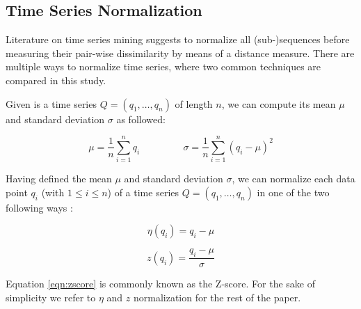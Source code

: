 \subsection{Time Series Normalization} \label{time_series_normalization} 

Literature on time series mining \cite{ding2008querying,spiegel2015diss} suggests to normalize all (sub-)sequences before measuring their pair-wise dissimilarity by means of a distance measure. There are multiple ways to normalize time series, where two common techniques \cite{das1998rule} are compared  in this study.

Given is a time series $Q = (q_1, \dots, q_n)$ of length $n$, we can compute its mean $\mu$ and standard deviation $\sigma$ as followed:

\begin{equation*}
\mu = \frac{1}{n} \sum_{i=1}^{n} q_i 	\;\;\;\;\;\;\;\;\;\;\;\;\;\;\;\; 	\sigma = \frac{1}{n} \sum_{i=1}^{n} (q_i - \mu)^2
\end{equation*}

Having defined the mean $\mu$ and standard deviation $\sigma$, we can normalize each data point $q_i$ (with $1\leq i \leq n$) of a time series $Q = (q_1, \dots, q_n)$ in one of the two following ways \cite{das1998rule}:

\begin{equation}
\eta(q_i) = q_i - \mu
\end{equation}

\begin{equation}
z(q_i) = \frac{q_i - \mu}{\sigma}
\label{eqn:zscore}
\end{equation}

Equation \ref{eqn:zscore} is commonly known as the Z-score. For the sake of simplicity we refer to $\eta$ and $z$ normalization \cite{das1998rule} for the rest of the paper.


